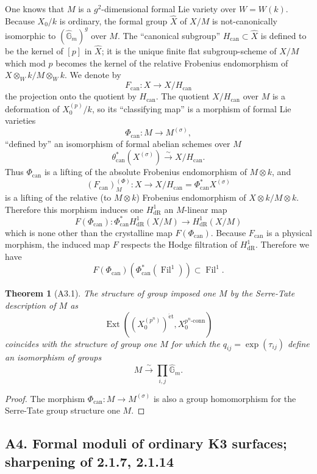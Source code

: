 \documentclass[12pt,a4paper]{article}
\theoremstyle{plain}
\newtheorem{theorem}{Theorem}[section]
\theoremstyle{definition}
\theoremstyle{remark}
\DeclareMathOperator{\Fil}{Fil}
\DeclareMathOperator{\Ext}{Ext}
\providecommand{\Ext}{\operatorname{Ext}}
\begin{document}
One knows that $M$ is a $g^2$-dimensional formal Lie variety over $W = W(k)$. Because $X_0/k$ is ordinary, the formal group $\hat{X}$ of $X/M$ is not-canonically isomorphic to $(\hat{\mathbb{G}}_m)^g$ over $M$. The ``canonical subgroup'' $H_{\mathrm{can}} \subset \hat{X}$ is defined to be the kernel of $[p]$ in $\hat{X}$; it is the unique finite flat subgroup-scheme of $X/M$ which mod $p$ becomes the kernel of the relative Frobenius endomorphism of $X \otimes_W k/M \otimes_W k$. We denote by
\[
F_{\mathrm{can}} : X \longrightarrow X/H_{\mathrm{can}}
\]
the projection onto the quotient by $H_{\mathrm{can}}$. The quotient $X/H_{\mathrm{can}}$ over $M$ is a deformation of $X_0^{(p)}/k$, so its ``classifying map'' is a morphism of formal Lie varieties
\[
\Phi_{\mathrm{can}} : M \longrightarrow M^{(\sigma)},
\]
``defined by'' an isomorphism of formal abelian schemes over $M$
\[
\theta_{\mathrm{can}}^*(X^{(\sigma)}) \xrightarrow{\sim} X/H_{\mathrm{can}}.
\]
Thus $\Phi_{\mathrm{can}}$ is a lifting of the absolute Frobenius endomorphism of $M \otimes k$, and
\[
(F_{\mathrm{can}})_M^{(\Phi)} : X \longrightarrow X/H_{\mathrm{can}} = \Phi_{\mathrm{can}}^* X^{(\sigma)}
\]
is a lifting of the relative (to $M \otimes k$) Frobenius endomorphism of $X \otimes k/M \otimes k$. Therefore this morphism induces one $H^1_\mathrm{dR}$ an $M$-linear map
\[
F(\Phi_{\mathrm{can}}) : \Phi_{\mathrm{can}}^* H^1_\mathrm{dR}(X/M) \longrightarrow H^1_\mathrm{dR}(X/M)
\]
which is none other than the crystalline map $F(\Phi_{\mathrm{can}})$. Because $F_{\mathrm{can}}$ is a physical morphism, the induced map $F$ respects the Hodge filtration of $H^1_\mathrm{dR}$. Therefore we have
\[
F(\Phi_{\mathrm{can}})(\Phi_{\mathrm{can}}^*(\Fil^1)) \subset \Fil^1.
\]

\begin{theorem}[A3.1]
The structure of group imposed one $M$ by the Serre-Tate description of $M$ as
\[
\Ext((X_0^{(p^n)})^{\mathrm{\acute{e}t}}, X_0^{p^n\text{-}\mathrm{conn}})
\]
coincides with the structure of group one $M$ for which the $q_{ij} = \exp(\tau_{ij})$ define an isomorphism of groups
\[
M \xrightarrow{\sim} \prod_{i,j} \hat{\mathbb{G}}_m.
\]
\end{theorem}

\begin{proof}
The morphism $\Phi_{\mathrm{can}} : M \to M^{(\sigma)}$ is also a group homomorphism for the Serre-Tate group structure one $M$. \qedhere
\end{proof}

\subsection*{A4. Formal moduli of ordinary K3 surfaces; sharpening of 2.1.7, 2.1.14}
\end{document}
